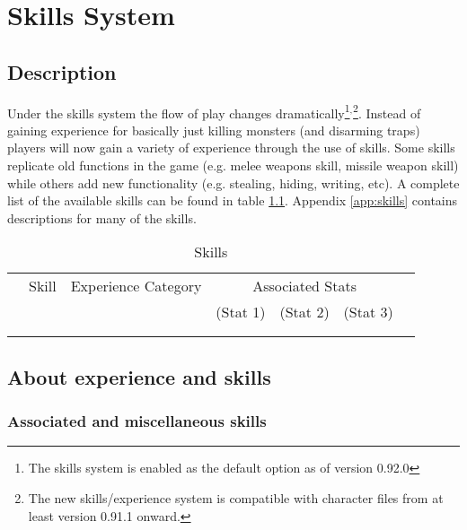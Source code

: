 
\chapter{Skills System}\label{chap:skills}

\section{Description}

Under the skills system the flow of play changes 
dramatically\footnote{The skills system is enabled as the default option 
as of version 
0.92.0}$^{, }$\footnote{The new skills/experience system is compatible 
with character files from at least version 0.91.1 onward.}. 
Instead of gaining experience for basically just killing monsters (and disarming
traps) players will now gain a variety of experience through the use
of skills. Some skills replicate old functions in the game (e.g. melee
weapons skill, missile weapon skill) while others add new functionality
(e.g. stealing, hiding, writing, etc).  A complete list of the available 
skills can be found in table \ref{tab:skill_stats}. Appendix \ref{app:skills} 
contains descriptions for many of the skills. 

\begin{table}
\begin{center}
\caption{Skills \label{tab:skill_stats}}
\small
\vskip 12pt
\begin{tabular}{|clccccc|} \hline 
 & Skill & Experience Category & \multicolumn{3}{c}{Associated Stats} & \\ 
 & & & (Stat 1) & (Stat 2) & (Stat 3) & \\ \hline\hline  
 & & & & & & \\

 & & & & & & \\
\hline
\end{tabular}
\end{center}
\end{table}


\section{About experience and skills}

\subsection{Associated and miscellaneous skills}

